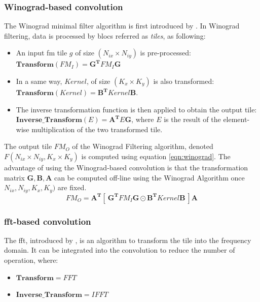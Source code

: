 \subsubsection{Winograd-based convolution}
%
The Winograd minimal filter algorithm is first introduced by \cite{winograd_arithmetic_1980}. In Winograd filtering, data is processed by blocs referred as \textit{tiles}, as following:
\begin{itemize}
    \item An input \acrshort{fm} tile $g$ of size $(N_{ix} \times N_{iy})$ is pre-processed: $\boldsymbol{Transform}(FM_I) = \boldsymbol{G^{T}} FM_I \boldsymbol{G} $
    \item In a same way, $Kernel$, of size $(K_x \times K_y)$ is also transformed: $\boldsymbol{Transform}(Kernel) = \boldsymbol{B^{T}} Kernel \boldsymbol{B}$.
    \item The inverse transformation function is then applied to obtain the output tile: $\boldsymbol{Inverse\_Transform}(E) = \boldsymbol{A^{T}} E \boldsymbol{G}$, where $E$ is the result of the element-wise multiplication of the two transformed tile.
\end{itemize}
The output tile $FM_O$ of the Winograd Filtering algorithm, denoted $F(N_{ix} \times N_{iy}, K_x \times K_y)$ is computed using equation \ref{eqn:winograd}. The advantage of using the Winograd-based convolution is that the transformation matrix $\boldsymbol{G}, \boldsymbol{B}, \boldsymbol{A}$ can be computed off-line using the Winograd Algorithm \cite{winograd_arithmetic_1980} once $N_{ix}, N_{iy}, K_x, K_y)$ are fixed.
\begin{equation}
\label{eqn:winograd}
FM_O = \boldsymbol{A^{T}} [ \ \boldsymbol{G^{T}} FM_I \boldsymbol{G} \odot \boldsymbol{B^{T}} Kernel \boldsymbol{B} \ ] \boldsymbol{A}
\end{equation}
%
\subsubsection{\acrshort{fft}-based convolution}
%
The \acrshort{fft}, introduced by \textcite{cooley_algorithm_1965}, is an algorithm to transform the tile into the frequency domain. It can be integrated into the convolution to reduce the number of operation, where:
\begin{itemize}
    \item $\boldsymbol{Transform} = FFT$
    \item $\boldsymbol{Inverse\_Transform} = IFFT$
\end{itemize}
%

